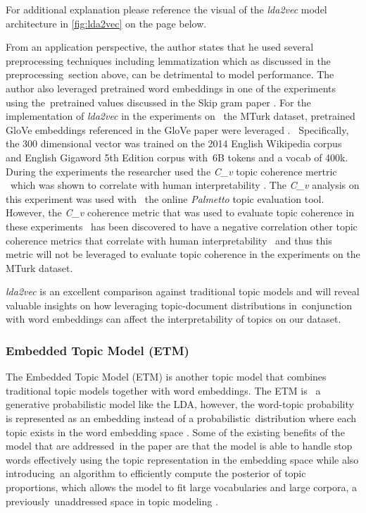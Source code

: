 \documentclass[letterpaper,12pt]{article}
\begin{document}
For additional explanation please reference the visual of the \emph{lda2vec} model architecture in \ref{fig:lda2vec} \cite{moody2016mixing} on the page below.


\newpage
From an application perspective, the author states that he used several preprocessing techniques including lemmatization which as discussed in the preprocessing\
section above, can be detrimental to model performance. The author also leveraged pretrained word embeddings in one of the experiments using the\
pretrained values discussed in the Skip gram paper \cite{mikolov2013distributed}. For the implementation of \emph{lda2vec} in the experiments on \
the MTurk dataset, pretrained GloVe embeddings referenced in the GloVe paper were leveraged \cite{pennington2014glove}. \
Specifically, the 300 dimensional vector was trained on the 2014 English Wikipedia corpus and English Gigaword 5th Edition corpus with\
6B tokens and a vocab of 400k.
During the experiments the researcher used the \emph{C\_v} topic coherence mertric \
which was shown to correlate with human interpretability \cite{roder2015exploring}. The \emph{C\_v} analysis on this experiment was used with \
the online \emph{Palmetto} \cite{palmetto} topic evaluation tool. However, the \emph{C\_v} coherence metric that was used to evaluate topic coherence in these experiments \
has been discovered to have a negative correlation other topic coherence metrics \cite{palmetto} that correlate with human interpretability \cite{mimno2011optimizing} \cite{newman2010automatic}\
and thus this metric will not be leveraged to evaluate topic coherence in the experiments on the MTurk dataset.

\emph{lda2vec} is an excellent comparison against traditional topic models and will reveal valuable insights on how leveraging topic-document distributions in\
conjunction with word embeddings can affect the interpretability of topics on our dataset.

\subsubsection{Embedded Topic Model (ETM)}
The Embedded Topic Model (ETM) is another topic model that combines traditional topic models together with word embeddings. The ETM is \
a generative probabilistic model like the LDA, however, the word-topic probability is represented as an embedding instead of a probabilistic\
distribution where each topic exists in the word embedding space \cite{dieng2019topic}. Some of the existing benefits of the model that are addressed\
in the paper are that the model is able to handle stop words effectively using the topic representation in the embedding space while also introducing\
an algorithm to efficiently compute the posterior of topic proportions, which allows the model to fit large vocabularies and large corpora, a previously\
unaddressed space in topic modeling \cite{dieng2019topic}.
\end{document}
